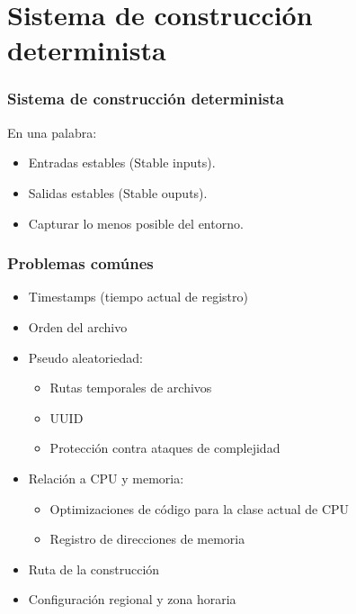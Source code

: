 \documentclass[14pt,aspectratio=169]{beamer}
\begin{document}
\section{Sistema de construcción determinista}

\begin{frame}
\frametitle{Sistema de construcción determinista}

En una palabra:

\begin{itemize}
\item Entradas estables (Stable inputs).
\item Salidas estables (Stable ouputs).
\item Capturar lo menos posible del entorno.
\end{itemize}
\end{frame}

\begin{frame}
 \frametitle{Problemas comúnes}

 \begin{itemize}
  \item Timestamps (tiempo actual de registro)
  \item Orden del archivo
  \item Pseudo aleatoriedad:
   \begin{itemize}
    \item Rutas temporales de archivos
    \item UUID
    \item Protección contra ataques de complejidad
   \end{itemize}
  \item Relación a CPU y memoria:
   \begin{itemize}
    \item Optimizaciones de código para la clase actual de CPU
    \item Registro de direcciones de memoria
   \end{itemize}
  \item Ruta de la construcción
  \item Configuración regional y zona horaria
 \end{itemize}
\end{frame}
\end{document}
